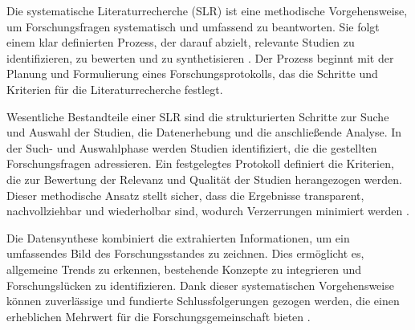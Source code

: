 Die systematische Literaturrecherche (SLR) ist eine methodische Vorgehensweise, um Forschungsfragen 
systematisch und umfassend zu beantworten. Sie folgt einem klar definierten Prozess, der darauf abzielt, 
relevante Studien zu identifizieren, zu bewerten und zu synthetisieren \cite{kitchenham2007guidelines}. 
Der Prozess beginnt mit der Planung und Formulierung eines Forschungsprotokolls, das die Schritte und 
Kriterien für die Literaturrecherche festlegt.

Wesentliche Bestandteile einer SLR sind die strukturierten Schritte zur Suche und Auswahl der Studien, 
die Datenerhebung und die anschließende Analyse. In der Such- und Auswahlphase werden Studien identifiziert, 
die die gestellten Forschungsfragen adressieren. Ein festgelegtes Protokoll definiert die Kriterien, die 
zur Bewertung der Relevanz und Qualität der Studien herangezogen werden. Dieser methodische Ansatz stellt 
sicher, dass die Ergebnisse transparent, nachvollziehbar und wiederholbar sind, wodurch Verzerrungen 
minimiert werden \cite{okoli2015guide}.

Die Datensynthese kombiniert die extrahierten Informationen, um ein umfassendes Bild des Forschungsstandes 
zu zeichnen. Dies ermöglicht es, allgemeine Trends zu erkennen, bestehende Konzepte zu integrieren und 
Forschungslücken zu identifizieren. Dank dieser systematischen Vorgehensweise können zuverlässige und 
fundierte Schlussfolgerungen gezogen werden, die einen erheblichen Mehrwert für 
die Forschungsgemeinschaft bieten \cite{petersen2008systematic}.

